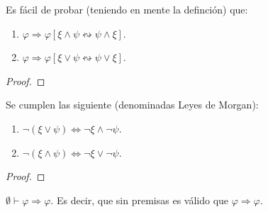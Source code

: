 \documentclass[12pt]{report}
\newcounter{it}
\theoremstyle{largebreak}
\begin{document}
    \begin{obs}
        Es fácil de probar (teniendo en mente la definción) que:
        \begin{enumerate}
            \item $\varphi\Rightarrow\varphi[\xi\land\psi\leftrightsquigarrow \psi\land\xi]$.
            \item $\varphi\Rightarrow\varphi[\xi\lor\psi\leftrightsquigarrow \psi\lor\xi]$.
        \end{enumerate}
    \end{obs}

    \begin{proof}
        
    \end{proof}

    \begin{propo}
        Se cumplen las siguiente (denominadas Leyes de Morgan):
        \begin{enumerate}
            \item $\neg(\xi\lor\psi)\iff \neg\xi\land\neg\psi$.
            \item $\neg(\xi\land\psi)\iff \neg\xi\lor\neg\psi$.
        \end{enumerate}
    \end{propo}

    \begin{proof}
        
    \end{proof}

    \begin{lema}
        $\emptyset\vdash\varphi\Rightarrow\varphi$. Es decir, que sin premisas es válido que $\varphi\Rightarrow\varphi$.
    \end{lema}
\end{document}
